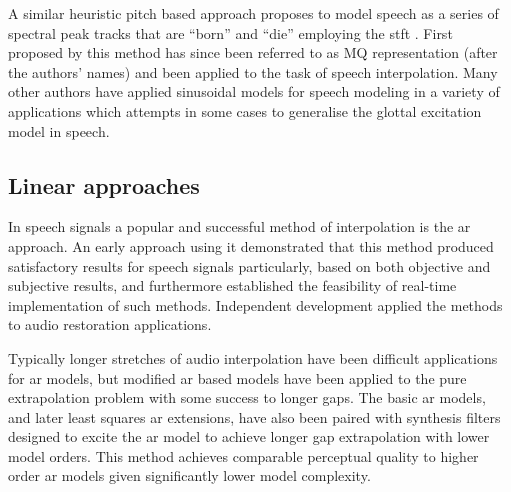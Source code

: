 A similar heuristic pitch based approach proposes to model speech as a series of spectral peak tracks that are ``born'' and ``die'' employing the \gls{stft} \cite{Maher1994}. First proposed by \cite{McAulay1986} this method has since been referred to as MQ representation (after the authors' names) and been applied to the task of speech interpolation\cite{Maher1994}. Many other authors have applied sinusoidal models for speech modeling in a variety of applications\cite{Godsill1998book}\cite{Vera-Candeas2003}\cite{Wells2006} which attempts in some cases to generalise the glottal excitation model in speech\cite{McAulay1986}.


\subsection{Linear approaches}\label{sec:LitRev_RestorationLin}

In speech signals a popular and successful method of interpolation is the \gls{ar} approach\cite{Vaseghi1988thesis}\cite{Godsill1998book}\cite{Kauppinen2002b}. An early approach using it demonstrated that this method produced satisfactory results for speech signals particularly, based on both objective and subjective results, and furthermore established the feasibility of real-time implementation of such methods\cite{Janssen1986}. Independent development applied the methods to audio restoration applications\cite{Vaseghi1988thesis}\cite{Vaseghi1990}.

Typically longer stretches of audio interpolation have been difficult applications for \gls{ar} models\cite{Veldhuis1992}\cite{Kauppinen2002b}, but modified \gls{ar} based models have been applied to the pure extrapolation problem with some success to longer gaps\cite{Kauppinen2002b}. The basic \gls{ar} models, and later least squares \gls{ar} extensions\cite{Godsill1998book}, have also been paired with synthesis filters designed to excite the \gls{ar} model to achieve longer gap extrapolation with lower model orders\cite{Esquef2006}. This method achieves comparable perceptual quality to higher order \gls{ar} models given significantly lower model complexity\cite{Esquef2006}.

